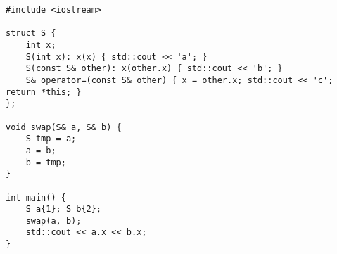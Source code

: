 \begin{lstlisting}[title=\href{https://godbolt.org/z/2D-DSX}{\texttt{godbolt.org/z/2D-DSX}}]
#include <iostream>

struct S { 
    int x;
    S(int x): x(x) { std::cout << 'a'; }
    S(const S& other): x(other.x) { std::cout << 'b'; }
    S& operator=(const S& other) { x = other.x; std::cout << 'c'; return *this; }
};

void swap(S& a, S& b) {
    S tmp = a;
    a = b;
    b = tmp;
}

int main() {
    S a{1}; S b{2};
    swap(a, b);
    std::cout << a.x << b.x;
}
\end{lstlisting}

